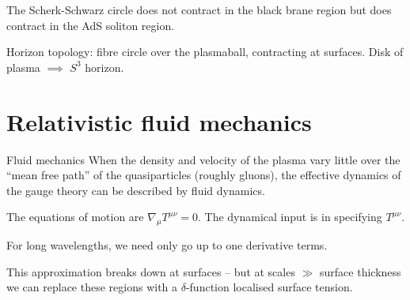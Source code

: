 \documentclass{beamer}
\newcommand{\tc}{\mathcal{T_\mathrm{c}}}
\newcommand{\tloc}{\mathcal{T}}
\newcommand{\ploc}{\mathcal{P}}
\begin{document}

\begin{frame}{}
%

 The Scherk-Schwarz circle does not contract in the black brane region but does contract in the AdS soliton region.
 \begin{center}
   
 \end{center}
 Horizon topology: fibre circle over the plasmaball, contracting at surfaces.
 Disk of plasma $\implies$ $S^3$ horizon.
%
\end{frame}


\section{Relativistic fluid mechanics}

%


\begin{frame}{Fluid mechanics}
%
 When the density and velocity of the plasma vary little over the ``mean free path'' of the quasiparticles (roughly gluons), the effective dynamics of the gauge theory can be described by fluid dynamics.

 \vp The equations of motion are $\nabla_\mu T^{\mu\nu}=0$. The dynamical input is in specifying $T^{\mu\nu}$.

 \vp For long wavelengths, we need only go up to one derivative terms.

 \vp This approximation breaks down at surfaces -- but at scales $\gg$ surface thickness we can replace these regions with a $\delta$-function localised surface tension.
%
\end{frame}
\end{document}
